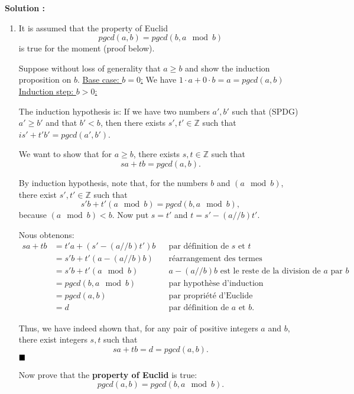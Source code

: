 \documentclass[11pt]{article} %
\newenvironment{solution}[1][\unskip]{%
	\par
	\noindent
	\textbf{Solution #1:}
	\noindent}
{\medskip}
\begin{document}
	\begin{solution}
	
		\begin{enumerate}
			\item {It is assumed that the property of Euclid
				$$ pgcd (a, b) = pgcd (b, a \mod b) $$
				is true for the moment (proof below).

				Suppose without loss of generality that $ a \geq b $ and show the induction proposition on $ b $. \underline {Base case: $ b = 0 $:} We have $ 1 \cdot a + 0 \cdot b = a = pgcd (a, b) $ \underline {Induction step: $ b> 0 $:}

				The induction hypothesis is: If we have two numbers $ a ', b' $ such that (SPDG) $ a '\geq b' $ and that $ b '<b $, then there exists $ s' , t '\in \mathbb {Z} $ such that $ is' + t'b' = pgcd (a ', b') $.

				We want to show that for $ a \geq b $, there exists $ s, t \in \mathbb {Z} $ such that $$ sa + tb = pgcd (a, b). $$

				By induction hypothesis, note that, for the numbers $ b $ and $ (a \mod b) $, there exist $ s ', t' \in \mathbb {Z} $ such that $$ s'b + t '(a \mod 	b) = pgcd (b, a \mod b), $$
				because $ (a \mod b) <b $. Now put $ s = t '$ and $ t = s' - (a // b) t' $.
				
				Nous obtenons:
				\begin{align*}
				sa+tb&=t'a + (s'-(a // b)t')b &&\text{par définition de $s$ et $t$}\\
				&=s'b + t' (a-(a // b)b)&&\text{réarrangement des termes}\\
				&=s'b + t'(a\mod b)&&\text{$a-(a // b)b$ est le reste de la division de $a$ par $b$}\\
				&= pgcd(b, a\mod b) &&\text{par hypothèse d'induction}\\
				&= pgcd(a, b) &&\text{par propriété d'Euclide}\\
				&=d &&\text{par définition de $a$ et $b$}.
				\end{align*}}
			
			
			Thus, we have indeed shown that, for any pair of positive integers $ a $ and $ b $, there exist integers $ s, t $ such that $$ sa + tb = d = pgcd (a, b) . $$ $ \hfill \blacksquare $

			Now prove that the \textbf {property of Euclid} is true:
			$$ pgcd (a, b) = pgcd (b, a \mod b). $$
			

\end{enumerate}
\end{solution}
\end{document}
